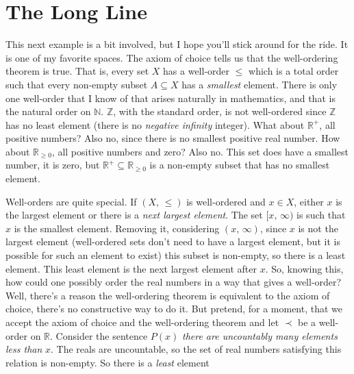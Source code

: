 \documentclass{article}
\theoremstyle{plain}
\theoremstyle{normal}
\begin{document}
    \section{The Long Line}
        This next example is a bit involved, but I hope you'll stick
        around for the ride. It is one of my favorite spaces. The axiom of
        choice tells us that the well-ordering theorem is true. That is,
        every set $X$ has a well-order $\leq$ which is a total order such
        that every non-empty subset $A\subseteq{X}$ has a \textit{smallest}
        element. There is only one well-order that I know of that arises
        naturally in mathematics, and that is the natural order on
        $\mathbb{N}$. $\mathbb{Z}$, with the standard order, is not
        well-ordered since $\mathbb{Z}$ has no least element
        (there is no \textit{negative infinity} integer). What about
        $\mathbb{R}^{+}$, all positive numbers? Also no, since there is
        no smallest positive real number. How about
        $\mathbb{R}_{\geq{0}}$, all positive numbers and zero? Also no.
        This set does have a smallest number, it is zero, but
        $\mathbb{R}^{+}\subseteq\mathbb{R}_{\geq{0}}$ is a non-empty subset
        that has no smallest element.
        \par\hfill\par
        Well-orders are quite special. If $(X,\,\leq)$ is well-ordered and
        $x\in{X}$, either $x$ is the largest element or there is a
        \textit{next largest element}. The
        set $[x,\,\infty)$ is such that $x$ is the smallest element. Removing
        it, considering $(x,\,\infty)$, since $x$ is not the largest element
        (well-ordered sets don't need to have a largest element, but it is
        possible for such an element to exist) this subset is
        non-empty, so there is a least element. This least element is the
        next largest element after $x$. So, knowing this, how could one possibly
        order the real numbers in a way that gives a well-order? Well, there's
        a reason the well-ordering theorem is equivalent to the axiom of choice,
        there's no constructive way to do it. But pretend, for a moment, that
        we accept the axiom of choice and the well-ordering theorem and let
        $\prec$ be a well-order on $\mathbb{R}$. Consider the sentence
        $P(x)$ \textit{there are uncountably many elements less than} $x$.
        The reals are uncountable, so the set of real numbers satisfying this
        relation is non-empty. So there is a \textit{least} element
\end{document}
